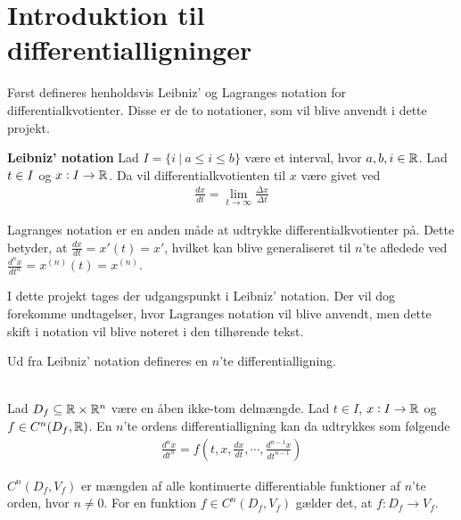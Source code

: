 \section{Introduktion til differentialligninger}
Først defineres henholdsvis Leibniz' og Lagranges notation for differentialkvotienter. Disse er de to notationer, som vil blive anvendt i dette projekt.

\begin{defn}\textbf{Leibniz' notation}
\newline
Lad $I = \{i \ | \ a \leq i \leq b\}$ være et interval, hvor $a,b,i\in \mathbb{R}$. Lad $t \in I $ og $x:I \to \mathbb{R}$. Da vil differentialkvotienten til $x$ være givet ved
%
\begin{align*}
    \frac{dx}{dt}=\lim_{t \to \infty}\frac{\Delta x}{\Delta t}
\end{align*}

\end{defn}
Lagranges notation er en anden måde at udtrykke differentialkvotienter på. Dette betyder, at $\frac{dx}{dt}=x'(t)=x'$, hvilket kan blive generaliseret til $n$'te afledede ved $\frac{d^nx}{dt^n}=x^{(n)}(t)=x^{(n)}$.

I dette projekt tages der udgangspunkt i Leibniz' notation. Der vil dog forekomme undtagelser, hvor Lagranges notation vil blive anvendt, men dette skift i notation vil blive noteret i den tilhørende tekst.

Ud fra Leibniz' notation defineres en $n$'te differentialligning.

\begin{defn}\label{def:generel_differentialligning} \textbf{}\\
Lad $D_f \subseteq \mathbb{R} \times \mathbb{R}^n$ være en åben ikke-tom delmængde. Lad $t \in I$, $x:I \to \mathbb{R}$ og $f \in C^n(D_f,\mathbb{R})$. En $n$'te ordens differentialligning kan da udtrykkes som følgende
%
\begin{align*}
    \frac{d^nx}{dt^n}=f\left(t, x, \frac{dx}{dt},\cdots, \frac{d^{n-1}x}{dt^{n-1}}\right )
\end{align*}
\end{defn}

$C^n(D_f, V_f)$ er mængden af alle kontinuerte differentiable funktioner af $n$'te orden, hvor $n \neq 0$. For en funktion $f \in C^n(D_f, V_f)$ gælder det, at $f: D_f \to V_f$. 


